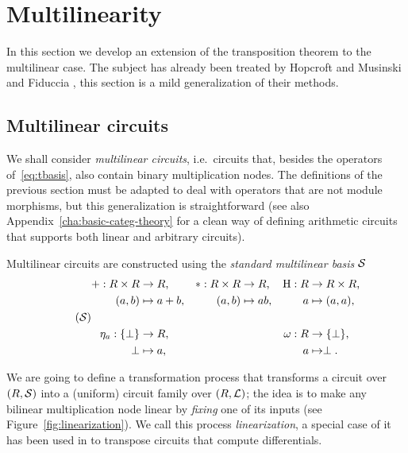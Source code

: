 \section{Multilinearity}
\label{sec:multi}

In this section we develop an extension of the transposition theorem
to the multilinear case.  The subject has already been treated by
Hopcroft and Musinski \cite{hopcroft+musinski73} and Fiduccia
\cite{fiduccia:phd}, this section is a mild generalization of their
methods.

\subsection{Multilinear circuits}
\label{sec:multilinear-circuits}
We shall consider \emph{multilinear
  circuits}, i.e.\ circuits that, besides the operators
of~\ref{eq:tbasis}, also contain binary multiplication nodes. The
definitions of the previous section must be adapted to deal with
operators that are not module morphisms, but this generalization is
straightforward (see also Appendix~\ref{cha:basic-categ-theory} for a
clean way of defining arithmetic circuits that supports both linear
and arbitrary circuits).

  Multilinear circuits are constructed using
the \emph{standard multilinear
  basis} $\mathcal{S}$
\begin{equation}
  \label{eq:sbasis}
  \tag{$\Sbasis$}
  \begin{aligned}
    + : R\times R &\ra R\text{,}    & * : R\times R &\ra R\text{,} &  \hub : R &\ra R\times R\text{,}\\
      (a, b) &\mapsto a+b\text{,}   &   (a, b) &\mapsto ab\text{,} &         a &\mapsto (a,a)\text{,}\\ \\
    \eta_a : \{\bom\} &\ra R\text{,}     &&& \omega : R &\ra \{\bom\}\text{,} \\
          \bom &\mapsto a\text{,} &&&          a &\mapsto \bom\text{.}
  \end{aligned}
\end{equation}


We are going to define a transformation process that transforms a
circuit over $(R,\mathcal{S})$ into a (uniform) circuit family over
$(R,\mathcal{L})$; the idea is to make any bilinear multiplication node
linear by \emph{fixing} one of its inputs (see
Figure~\ref{fig:linearization}). We call this process
\emph{linearization}, a special case of it has been used in
\cite{gashkov+gashkov05,sergeev08} to transpose circuits that compute
differentials.

